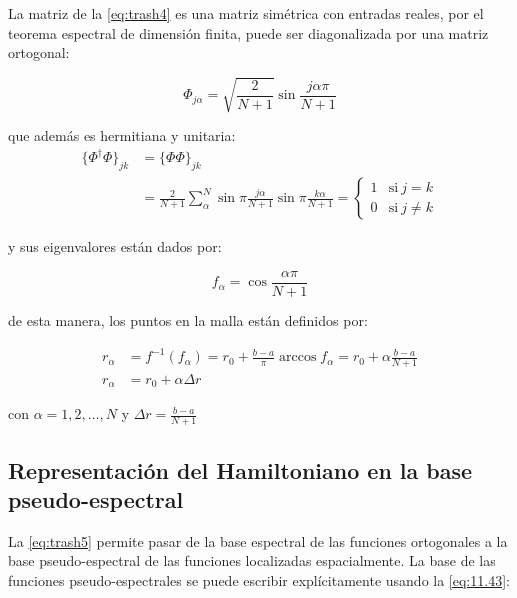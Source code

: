 La matriz de la \autoref{eq:trash4} es una matriz simétrica con entradas reales, por el teorema espectral de dimensión finita, puede ser diagonalizada por una matriz ortogonal:

\begin{equation}
  \label{eq:trash5}
  \Phi_{j\alpha} = \sqrt{\frac{2}{N+1}}\sin{\frac{j\alpha \pi}{N+1}}
\end{equation}

que además es hermitiana y unitaria:
\begin{align}
  \label{eq:unitaryproof}
  \{\Phi^{\dagger} \Phi\}_{jk} &= \{\Phi \Phi\}_{jk} \\
                      &= \frac{2}{N+1} \sum_{\alpha}^{N} \sin{\pi\frac{j\alpha}{N+1}}\sin{\pi\frac{k\alpha}{N+1}} =
                        \begin{cases}
                          1 & \text{si}\ j=k \\
                          0 & \text{si}\ j\neq k
                        \end{cases}
\end{align}


y sus eigenvalores están dados por: \cite{Noschese2012}

\begin{equation}
  \label{eq:trash7}
  f_{\alpha} = \cos{\frac{\alpha \pi}{N+1}}
\end{equation}

de esta manera, los puntos en la malla están definidos por:

\begin{align}
  \label{eq:trash8}
  r_{\alpha} &= f^{-1}(f_{\alpha}) = r_0 + \frac{b-a}{\pi}\arccos{f_{\alpha}} = r_0 + \alpha \frac{b-a}{N+1} \nonumber\\
  r_{\alpha} &= r_0 + \alpha \Delta r
\end{align}

con $\alpha=1,2,\dots,N$ y $\Delta r = \frac{b-a}{N+1}$


\subsection{Representación del Hamiltoniano en la base pseudo-espectral}

La \autoref{eq:trash5} permite pasar de la base espectral de las funciones ortogonales a la base pseudo-espectral de las funciones localizadas espacialmente. La base de las funciones pseudo-espectrales se puede escribir explícitamente usando la \autoref{eq:11.43}:

